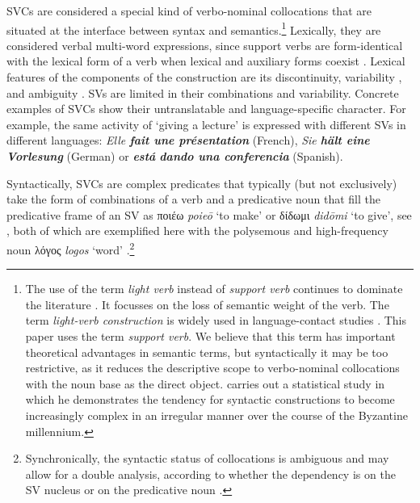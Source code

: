 \documentclass[output=paper,colorlinks,citecolor=brown]{langscibook}
\begin{document}
SVCs are considered a special kind of verbo-nominal collocations that are situated at the
interface between syntax and semantics.\footnote{The use of the term \emph{light verb}
  instead of \textit{support verb} continues to dominate the literature \citep{PompeiPiunnointro2023}. It focusses on the loss of semantic weight of the verb. The term \textit{light-verb construction}
  is widely used in language-contact studies
  \parencites{Myers-ScottonCarol-2002877,FendelVictoria-2021854,FendelVictoria-2023591}.
  This paper uses the term \emph{support verb}. We believe that this term has important
  theoretical advantages in semantic terms, but syntactically it may be too restrictive,
  as it reduces the descriptive scope to verbo-nominal collocations with the noun base as
  the direct object. \citet{KälviäinenNikolaos-2013215} carries out a statistical study in
  which he demonstrates the tendency for syntactic constructions to become increasingly
  complex in an irregular manner over the course of the Byzantine millennium.} Lexically, they are
considered verbal multi-word expressions, since support verbs are form-identical with the lexical
form of a verb when lexical and auxiliary forms coexist \parencite{BenteinKlaas-2013367}.
Lexical features of the components of the construction are its discontinuity, variability
\parencite{BooijGeert-2014823}, and ambiguity
\parencite[50]{SheinfuxLivnatandGreshlerTaliandMelnikNuritandWinterShuly-2019145}. SVs are
limited in their combinations and variability. Concrete examples of SVCs show their
untranslatable and language-specific character. For example, the same activity of `giving
a lecture' is expressed with different SVs in different languages: \emph{Elle \textbf{fait
    une présentation}} (French), \emph{Sie \textbf{hält eine Vorlesung}} (German) or
\emph{\textbf{está} \textbf{dando una conferencia}} (Spanish).

Syntactically, SVCs are complex predicates that typically (but not exclusively) take the
form of combinations of a verb and a predicative noun that fill the predicative frame of
an SV as ποιέω \emph{poieō} `to make' or δίδωμι \emph{didōmi} `to give', see
, both of which are exemplified here with the polysemous and
high-frequency noun λόγος \emph{logos} `word'
\parencite{VivesCuestaAlfonso-2021316}.\footnote{Synchronically, the syntactic status of
  collocations is ambiguous and may allow for a double analysis, according to whether the
  dependency is on the SV nucleus or on the predicative noun%
.}
\end{document}
